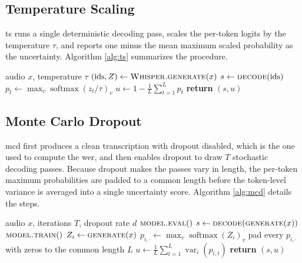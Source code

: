 \subsection{Temperature Scaling}
\acrshort{ts} runs a single deterministic decoding pass, scales the per-token logits by the temperature $\tau$, and reports one minus the mean maximum scaled probability as the uncertainty. Algorithm \ref{alg:ts} summarizes the procedure.

\begin{algorithm}[ht]
	\caption{Temperature Scaling uncertainty score}
	\label{alg:ts}
	\begin{algorithmic}[1]
		\Require audio $x$, temperature $\tau$
		\State $(\text{ids}, Z) \gets \textsc{Whisper.generate}(x)$ 
		\State $s \gets \textsc{decode}(\text{ids})$
		\State $p_t \gets \max_v \operatorname{softmax}(z_t / \tau)_v$
		\EndFor
		\State $u \gets 1 - \frac{1}{L}\sum_{t=1}^{L} p_t$
		\State \textbf{return} $(s, u)$
	\end{algorithmic}
\end{algorithm}

\subsection{Monte Carlo Dropout}
\acrshort{mcd} first produces a clean transcription with dropout disabled, which is the one used to compute the \acrshort{wer}, and then enables dropout to draw $T$ stochastic decoding passes. Because dropout makes the passes vary in length, the per-token maximum probabilities are padded to a common length before the token-level variance is averaged into a single uncertainty score. Algorithm \ref{alg:mcd} details the steps.

\begin{algorithm}[ht]
	\caption{Monte Carlo Dropout uncertainty score}
	\label{alg:mcd}
	\begin{algorithmic}[1]
		\Require audio $x$, iterations $T$, dropout rate $d$
		\State $\textsc{model.eval}()$ 
		\State $s \gets \textsc{decode}(\textsc{generate}(x))$
		\State $\textsc{model.train}()$ 
		\State $Z_i \gets \textsc{generate}(x)$
		\State $p_{i,\cdot} \gets \max_v \operatorname{softmax}(Z_i)_v$ 
		\EndFor
		\State pad every $p_{i,\cdot}$ with zeros to the common length $L$
		\State $u \gets \frac{1}{L}\sum_{t=1}^{L} \operatorname{var}_i\!\left(p_{i,t}\right)$
		\State \textbf{return} $(s, u)$
	\end{algorithmic}
\end{algorithm}

